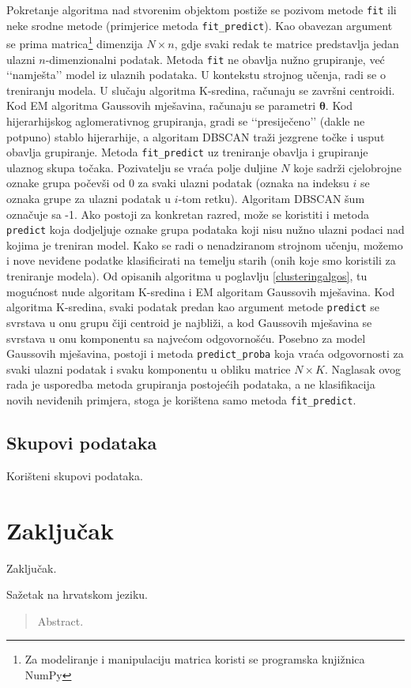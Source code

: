 \documentclass[times, utf8, zavrsni]{fer}
\begin{document}
Pokretanje algoritma nad stvorenim objektom postiže se pozivom metode \texttt{fit} ili neke srodne metode (primjerice metoda \texttt{fit\_predict}). Kao obavezan argument se prima matrica\footnote{Za modeliranje i manipulaciju matrica koristi se programska knjižnica NumPy} dimenzija $N \times n$, gdje svaki redak te matrice predstavlja jedan ulazni $n$-dimenzionalni podatak. Metoda \texttt{fit} ne obavlja nužno grupiranje, već ‘‘namješta’’ model iz ulaznih podataka. U kontekstu strojnog učenja, radi se o treniranju modela. U slučaju algoritma K-sredina, računaju se završni centroidi. Kod EM algoritma Gaussovih mješavina, računaju se parametri $\boldsymbol{\theta}$. Kod hijerarhijskog aglomerativnog grupiranja, gradi se ‘‘presiječeno’’ (dakle ne potpuno) stablo hijerarhije, a algoritam DBSCAN traži jezgrene točke i usput obavlja grupiranje. Metoda \texttt{fit\_predict} uz treniranje obavlja i grupiranje ulaznog skupa točaka. Pozivatelju se vraća polje duljine $N$ koje sadrži cjelobrojne oznake grupa počevši od 0 za svaki ulazni podatak (oznaka na indeksu $i$ se oznaka grupe za ulazni podatak u $i$-tom retku). Algoritam DBSCAN šum označuje sa -1. Ako postoji za konkretan razred, može se koristiti i metoda \texttt{predict} koja dodjeljuje oznake grupa podataka koji nisu nužno ulazni podaci nad kojima je treniran model. Kako se radi o nenadziranom strojnom učenju, možemo i nove neviđene podatke klasificirati na temelju starih (onih koje smo koristili za treniranje modela). Od opisanih algoritma u poglavlju \ref{clusteringalgos}, tu mogućnost nude algoritam K-sredina i EM algoritam Gaussovih mješavina. Kod algoritma K-sredina, svaki podatak predan kao argument metode \texttt{predict} se svrstava u onu grupu čiji centroid je najbliži, a kod Gaussovih mješavina se svrstava u onu komponentu sa najvećom odgovornošću. Posebno za model Gaussovih mješavina, postoji i metoda \texttt{predict\_proba} koja vraća odgovornosti za svaki ulazni podatak i svaku komponentu u obliku matrice $N \times K$. Naglasak ovog rada je usporedba metoda grupiranja postojećih podataka, a ne klasifikacija novih neviđenih primjera, stoga je korištena samo metoda \texttt{fit\_predict}.

\section{Skupovi podataka}
Korišteni skupovi podataka.

\chapter{Zaključak}
\label{chap:conclusion}
Zaključak.




\begin{sazetak}
Sažetak na hrvatskom jeziku.

\end{sazetak}
\begin{abstract}
Abstract.

\end{abstract}
\end{document}
